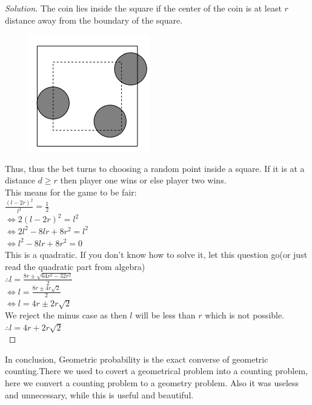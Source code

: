 \begin{proof}
    [Solution]
    The coin lies inside the square if the center of the coin is at least $r$ distance away from the boundary of the square.\\
    \begin{figure}[h]
        \centering
        \includegraphics[width=0.5\linewidth]{Photos/Cointoss onto square.png}        
    \end{figure}
    Thus, thus the bet turns to choosing a random point inside a square. If it is at a distance $d\geq r$ then player one wins or else player two wins.\\
    This means for the game to be fair:\\
    $\frac{(l-2r)^2}{l^2}=\frac{1}{2}$\\
    $\iff 2(l-2r)^2=l^2$\\
    $\iff 2l^2-8lr+8r^2=l^2$\\
    $ \iff l^2-8lr+8r^2=0$\\
    This is a quadratic. If you don't know how to solve it, let this question go(or just read the quadratic part from algebra)\\
    $\therefore l=\frac{8r\pm\sqrt{64r^2-32r^2}}{2}$\\
    $\iff l=\frac{8r\pm4r\sqrt{2}}{2}$\\
    $\iff l=4r\pm2r\sqrt{2}$\\
    We reject the minus case as then $l$ will be less than $r$ which is not possible.
    $\therefore l=4r+2r\sqrt{2}$\\
\end{proof}
In conclusion, Geometric probability is the exact converse of geometric counting.There we used to covert a geometrical problem into a counting problem, here we convert a counting problem to a geometry problem. Also it was useless and unnecessary, while this is useful and beautiful.\\
